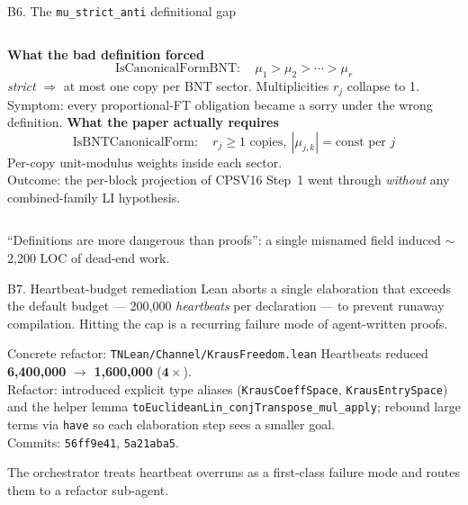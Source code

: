 \documentclass[aspectratio=169,10pt]{beamer}
\begin{document}
\begin{frame}{B6. The \texttt{mu\_strict\_anti} definitional gap}
    \begin{columns}[T]
        \textcolor{softred}{\textbf{What the bad definition forced}}
        \[
            \mathrm{IsCanonicalFormBNT}: \quad \mu_1 > \mu_2 > \cdots > \mu_r
        \]
        \emph{strict} $\Rightarrow$ at most one copy per BNT sector. Multiplicities $r_j$ collapse to 1.
        \vspace{0.4em}
        \\
        \textcolor{softred}{Symptom:} every proportional-FT obligation became a sorry under the wrong definition.
        \textcolor{leangreen}{\textbf{What the paper actually requires}}
        \[
            \mathrm{IsBNTCanonicalForm}: \quad r_j \geq 1 \text{ copies}, \ |\mu_{j,k}| = \text{const per }j
        \]
        Per-copy unit-modulus weights inside each sector.
        \vspace{0.4em}
        \\
        \textcolor{leangreen}{Outcome:} the per-block projection of CPSV16 Step~1 went through \emph{without} any combined-family LI hypothesis.
    \end{columns}
    \vspace{0.6em}
    \textcolor{dimwhite}{\footnotesize \community{} ``Definitions are more dangerous than proofs'': a single misnamed field induced $\sim$2{,}200 LOC of dead-end work.}
\end{frame}

\begin{frame}{B7. Heartbeat-budget remediation}
    Lean aborts a single elaboration that exceeds the default budget --- 200{,}000 \emph{heartbeats} per declaration --- to prevent runaway compilation. Hitting the cap is a recurring failure mode of agent-written proofs.
    \vspace{0.6em}
    \begin{block}{Concrete refactor: \texttt{TNLean/Channel/KrausFreedom.lean}}
        \footnotesize
        Heartbeats reduced \textbf{\textcolor{softred}{6{,}400{,}000}} $\to$ \textbf{\textcolor{leangreen}{1{,}600{,}000}} ($\mathbf{4\times}$).
        \\[3pt]
        Refactor: introduced explicit type aliases (\texttt{KrausCoeffSpace}, \texttt{KrausEntrySpace}) and the helper lemma \texttt{toEuclideanLin\_conjTranspose\_mul\_apply}; rebound large terms via \texttt{have} so each elaboration step sees a smaller goal.
        \\[3pt]
        Commits: \texttt{56ff9e41}, \texttt{5a21aba5}.
    \end{block}
    \vspace{0.4em}
    \textcolor{dimwhite}{\footnotesize The orchestrator treats heartbeat overruns as a first-class failure mode and routes them to a refactor sub-agent.}
\end{frame}
\end{document}
